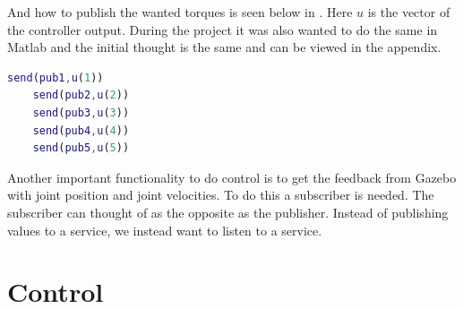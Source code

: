 And how to publish the wanted torques is seen below in . Here $u$ is the vector of the controller output. During the project it was also wanted to do the same in Matlab and the initial thought is the same and can be viewed in the appendix. 

\begin{lstlisting}[language=Matlab,caption={MATLAB code for publish wanted joint torques},label={lst:matlabPubs}]
    send(pub1,u(1))
    send(pub2,u(2))
    send(pub3,u(3))
    send(pub4,u(4))
    send(pub5,u(5))
\end{lstlisting}

Another important functionality to do control is to get the feedback from Gazebo with joint position and joint velocities. To do this a subscriber is needed. The subscriber can thought of as the opposite as the publisher. Instead of publishing values to a service, we instead want to listen to a service. 


\section{Control}


